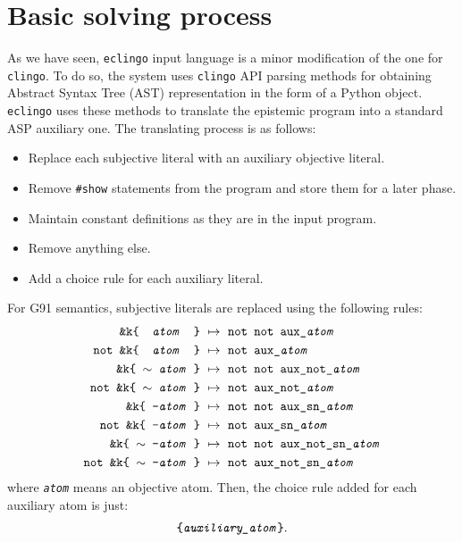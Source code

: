 \documentclass{new_tlp}
\def\eclingo{{\tt eclingo}}
\def\clingo{{\tt clingo}}
\begin{document}
\section{Basic solving process}
\label{sec:impl}
As we have seen, \eclingo{} input language is a minor modification of the one for \clingo{}.
To do so, the system uses \clingo{} API parsing methods for obtaining Abstract Syntax Tree (AST) representation in the form of a Python object. \eclingo{} uses these methods to translate the epistemic program into a standard ASP auxiliary one. The translating process is as follows:
\begin{itemize}
    \item Replace each subjective literal with an auxiliary objective literal.
    \item Remove {\tt \#show} statements from the program and store them for a later phase.
    \item Maintain constant definitions as they are in the input program.
    \item Remove anything else.
    \item Add a choice rule for each auxiliary literal.
\end{itemize}

For G91 semantics, subjective literals are replaced using the following rules:
\begin{align}
    \texttt{\&k\{ \ \emph{atom} \ \}} \ & \mapsto\ \texttt{not\ not\ aux\_\emph{atom}} \label{r:g91_1} \\
    \texttt{not\ \&k\{ \ \emph{atom} \ \}} \ & \mapsto\ \texttt{not\ aux\_\emph{atom}} \label{r:g91_2} \\
    \texttt{\&k\{\ $\sim$ \emph{atom}\  \}}\ & \mapsto\ \texttt{not\ not\ aux\_not\_\emph{atom}} \\
    \texttt{not\ \&k\{\ $\sim$ \emph{atom}\  \}}\ & \mapsto\ \texttt{not\ aux\_not\_\emph{atom}} \\
    \texttt{\&k\{\ {-}\emph{atom}\  \}}\ & \mapsto\ \texttt{not\ not\ aux\_sn\_\emph{atom}} \\
    \texttt{not\ \&k\{\ {-}\emph{atom}\  \}}\ & \mapsto\ \texttt{not\ aux\_sn\_\emph{atom}} \\
    \texttt{\&k\{\ $\sim$ {-}\emph{atom}\  \}}\ & \mapsto\ \texttt{not\ not\ aux\_not\_sn\_\emph{atom}} \\
    \texttt{not\ \&k\{\ $\sim$ {-}\emph{atom}\  \}}\ & \mapsto\ \texttt{not\ aux\_not\_sn\_\emph{atom}} \label{r:g91_8}
\end{align}
where \texttt{\emph{atom}} means an objective atom.
%
Then, the choice rule added for each auxiliary atom is just:
\begin{align*}
    \texttt{\{\emph{auxiliary\_atom}\}}.
\end{align*}
\end{document}

